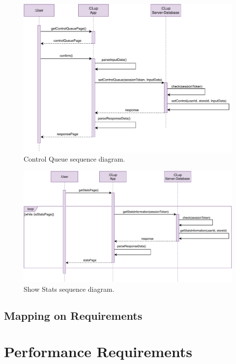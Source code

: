 \begin{figure}[H]
	\centering
	\includegraphics[width=1.0\textwidth]{images/getControlQueuePage_sequence_diagram.pdf}
	\caption{Control Queue sequence diagram.}
\end{figure}

\begin{figure}[H]
	\centering
	\includegraphics[width=1.0\textwidth]{images/getShowStatsPage_sequence_diagram.pdf}
	\caption{Show Stats sequence diagram.}
\end{figure}

\subsection{Mapping on Requirements}

\section{Performance Requirements}

